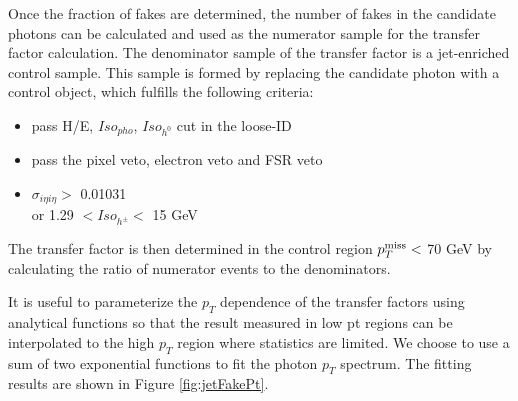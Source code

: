 \documentclass[thesis.tex]{subfiles}
\renewcommand\_{\textunderscore\allowbreak}
\begin{document}
Once the fraction of fakes are determined, the number of fakes in the candidate photons can be calculated and used as the numerator sample for the transfer factor calculation. The denominator sample of the transfer factor is a jet-enriched control sample. This sample is formed by replacing the candidate photon with a control object, which fulfills the following  criteria:
\begin{center}
\begin{itemize}
\item pass H/E, $Iso_{pho}$, $Iso_{h^0}$ cut in the loose-ID
\item pass the pixel veto, electron veto and FSR veto
\item $\sigma_{i\eta i\eta} >$ 0.01031 \\
     or   1.29 $< Iso_{h^\pm} <$ 15 GeV
\end{itemize}
\end{center}

The transfer factor is then determined in the control region $p_T^\textrm{miss} <$ 70 GeV by calculating the ratio of numerator events to the denominators.

It is useful to parameterize the $p_T$ dependence of the transfer factors using analytical functions so that the result measured in low pt regions can be interpolated to the high $p_T$ region where statistics are limited. We choose to use a sum of two exponential functions to fit the photon $p_T$ spectrum. The fitting results are shown in Figure \ref{fig:jetFakePt}.
\end{document}
